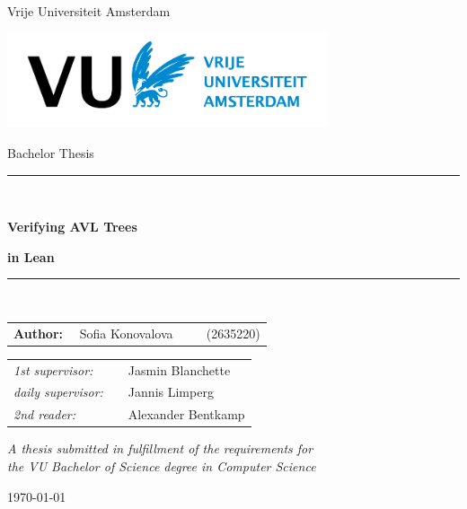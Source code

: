 \thispagestyle{empty}

\begin{center}

Vrije Universiteit Amsterdam

\vspace{1cm}

\includegraphics[height=28mm]{logo.png}

\vspace{1cm}

{\Large Bachelor Thesis}

\vspace*{1.5cm}

\rule{.9\linewidth}{.6pt}\\[0.4cm]
{\huge \bfseries Verifying AVL Trees\par}
{\huge \bfseries in Lean\par}\vspace{0.4cm}
\rule{.9\linewidth}{.6pt}\\[1.5cm]

\vspace*{2mm}

{\Large
\begin{tabular}{l}
{\bf Author:} ~~Sofia Konovalova ~~~~ (2635220)
\end{tabular}
}

\vspace*{1.5cm}

\begin{tabular}{ll}
{\it 1st supervisor:}   & ~~Jasmin Blanchette \\
{\it daily supervisor:} & ~~Jannis Limperg ~~~~ \\
{\it 2nd reader:}       & ~~Alexander Bentkamp
\end{tabular}

\vspace*{2cm}

\textit{A thesis submitted in fulfillment of the requirements for\\ the VU Bachelor of Science degree in Computer Science }

\vspace*{1cm}

\today\\[4cm] %

\end{center}